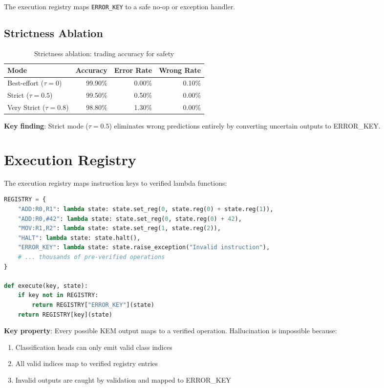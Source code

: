 \documentclass[11pt]{article}
\begin{document}
The execution registry maps \texttt{ERROR\_KEY} to a safe no-op or exception handler.

\subsection{Strictness Ablation}

\begin{table}[h]
\centering
\begin{tabular}{lrrr}
\toprule
\textbf{Mode} & \textbf{Accuracy} & \textbf{Error Rate} & \textbf{Wrong Rate} \\
\midrule
Best-effort ($\tau=0$) & 99.90\% & 0.00\% & 0.10\% \\
Strict ($\tau=0.5$) & 99.50\% & 0.50\% & 0.00\% \\
Very Strict ($\tau=0.8$) & 98.80\% & 1.30\% & 0.00\% \\
\bottomrule
\end{tabular}
\caption{Strictness ablation: trading accuracy for safety}
\end{table}

\textbf{Key finding}: Strict mode ($\tau=0.5$) eliminates wrong predictions entirely by converting uncertain outputs to ERROR\_KEY.

\section{Execution Registry}

The execution registry maps instruction keys to verified lambda functions:

\begin{lstlisting}[language=Python]
REGISTRY = {
    "ADD:R0,R1": lambda state: state.set_reg(0, state.reg(0) + state.reg(1)),
    "ADD:R0,#42": lambda state: state.set_reg(0, state.reg(0) + 42),
    "MOV:R1,R2": lambda state: state.set_reg(1, state.reg(2)),
    "HALT": lambda state: state.halt(),
    "ERROR_KEY": lambda state: state.raise_exception("Invalid instruction"),
    # ... thousands of pre-verified operations
}

def execute(key, state):
    if key not in REGISTRY:
        return REGISTRY["ERROR_KEY"](state)
    return REGISTRY[key](state)
\end{lstlisting}

\textbf{Key property}: Every possible KEM output maps to a verified operation. Hallucination is impossible because:
\begin{enumerate}
    \item Classification heads can only emit valid class indices
    \item All valid indices map to verified registry entries
    \item Invalid outputs are caught by validation and mapped to ERROR\_KEY
\end{enumerate}
\end{document}
